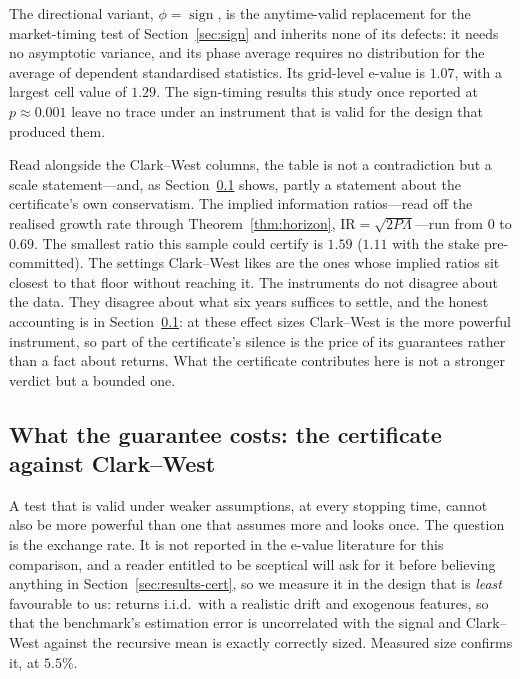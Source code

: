 \documentclass{article}
\theoremstyle{plain}
\theoremstyle{definition}
\begin{document}
The directional variant, $\phi=\operatorname{sign}$, is the anytime-valid replacement for
the market-timing test of Section~\ref{sec:sign} and inherits none of its defects: it needs
no asymptotic variance, and its phase average requires no distribution for the average of
dependent standardised statistics. Its grid-level e-value is $1.07$, with a largest cell value of $1.29$. The sign-timing
results
this study once reported at $p\approx0.001$ leave no trace under an instrument that is
valid for the design that produced them.

Read alongside the Clark--West columns, the table is not a contradiction but a scale
statement---and, as Section~\ref{sec:headtohead} shows, partly a statement about the
certificate's own conservatism. The implied information ratios---read off the realised growth rate through
Theorem~\ref{thm:horizon}, $\mathrm{IR}=\sqrt{2P\Lambda}$---run from $0$ to $0.69$. The
smallest ratio this sample could certify is $1.59$ ($1.11$ with the stake pre-committed).
The settings Clark--West likes are the ones whose implied ratios sit closest to that floor
without reaching it. The instruments do not disagree about the data. They disagree about what six years suffices
to settle, and the honest accounting is in Section~\ref{sec:headtohead}: at these effect sizes
Clark--West is the more powerful instrument, so part of the certificate's silence is the price
of its guarantees rather than a fact about returns. What the certificate contributes here is
not a stronger verdict but a bounded one.

\subsection{What the guarantee costs: the certificate against Clark--West}
\label{sec:headtohead}

A test that is valid under weaker assumptions, at every stopping time, cannot also be more
powerful than one that assumes more and looks once. The question is the exchange rate. It is
not reported in the e-value literature for this comparison, and a reader entitled to be
sceptical will ask for it before believing anything in Section~\ref{sec:results-cert}, so we
measure it in the design that is \emph{least} favourable to us: returns i.i.d.\ with a
realistic drift and exogenous features, so that the benchmark's estimation error is
uncorrelated with the signal and Clark--West against the recursive mean is exactly correctly
sized. Measured size confirms it, at $5.5\%$.
\end{document}
